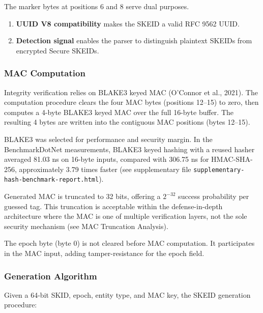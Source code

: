 \documentclass[fleqn,10pt,lineno]{wlpeerj}
\providecommand{\tightlist}{%
  \setlength{\itemsep}{0pt}\setlength{\parskip}{0pt}}
\begin{document}
The marker bytes at positions 6 and 8 serve dual purposes.

\begin{enumerate}
\def\labelenumi{\arabic{enumi}.}
\tightlist
\item
  \textbf{UUID V8 compatibility} makes the SKEID a valid RFC 9562 UUID.
\item
  \textbf{Detection signal} enables the parser to distinguish plaintext
  SKEIDs from encrypted Secure SKEIDs.
\end{enumerate}

\subsubsection{MAC Computation}\label{mac-computation}

Integrity verification relies on BLAKE3 keyed MAC (O'Connor et al.,
2021). The computation procedure clears the four MAC bytes (positions
12--15) to zero, then computes a 4-byte BLAKE3 keyed MAC over the full
16-byte buffer. The resulting 4 bytes are written into the contiguous
MAC positions (bytes 12--15).

BLAKE3 was selected for performance and security margin. In the
BenchmarkDotNet measurements, BLAKE3 keyed hashing with a reused hasher
averaged 81.03 ns on 16-byte inputs, compared with 306.75 ns for
HMAC-SHA-256, approximately 3.79 times faster (see supplementary file
\texttt{supplementary-hash-benchmark-report.html}).

Generated MAC is truncated to 32 bits, offering a \(2^{-32}\) success
probability per guessed tag. This truncation is acceptable within the
defense-in-depth architecture where the MAC is one of multiple
verification layers, not the sole security mechanism (see MAC Truncation
Analysis).

The epoch byte (byte 0) is not cleared before MAC computation. It
participates in the MAC input, adding tamper-resistance for the epoch
field.

\subsubsection{Generation Algorithm}\label{generation-algorithm-1}

Given a 64-bit SKID, epoch, entity type, and MAC key, the SKEID
generation procedure:
\end{document}
